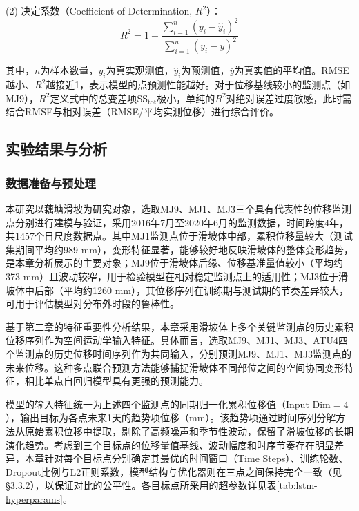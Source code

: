 \documentclass[12pt,a4paper]{article}
\begin{document}
(2) 决定系数（Coefficient of Determination, $R^2$）：
\begin{equation}
R^2 = 1 - \frac{\sum_{i=1}^{n}(y_i - \hat{y}_i)^2}{\sum_{i=1}^{n}(y_i - \bar{y})^2}
\label{eq:r2}
\end{equation}

其中，$n$为样本数量，$y_i$为真实观测值，$\hat{y}_i$为预测值，$\bar{y}$为真实值的平均值。RMSE越小、$R^2$越接近1，表示模型的点预测性能越好。对于位移基线较小的监测点（如MJ9），$R^2$定义式中的总变差项$\mathrm{SS_{tot}}$极小，单纯的$R^2$对绝对误差过度敏感，此时需结合RMSE与相对误差（RMSE/平均实测位移）进行综合评价。


\subsection{实验结果与分析}

\subsubsection{数据准备与预处理}

本研究以藕塘滑坡为研究对象，选取MJ9、MJ1、MJ3三个具有代表性的位移监测点分别进行建模与验证，采用2016年7月至2020年6月的监测数据，时间跨度4年，共1457个日尺度数据点。其中MJ1监测点位于滑坡体中部，累积位移量较大（测试集期间平均约989 mm），变形特征显著，能够较好地反映滑坡体的整体变形趋势，是本章分析展示的主要对象；MJ9位于滑坡体后缘、位移基准量值较小（平均约373 mm）且波动较窄，用于检验模型在相对稳定监测点上的适用性；MJ3位于滑坡体中后部（平均约1260 mm），其位移序列在训练期与测试期的节奏差异较大，可用于评估模型对分布外时段的鲁棒性。

基于第二章的特征重要性分析结果，本章采用滑坡体上多个关键监测点的历史累积位移序列作为空间运动学输入特征。具体而言，选取MJ9、MJ1、MJ3、ATU4四个监测点的历史位移时间序列作为共同输入，分别预测MJ9、MJ1、MJ3监测点的未来位移。这种多点联合预测方法能够捕捉滑坡体不同部位之间的空间协同变形特征，相比单点自回归模型具有更强的预测能力。

模型的输入特征统一为上述四个监测点的同期归一化累积位移值（Input Dim$=4$），输出目标为各点未来1天的趋势项位移（mm）。该趋势项通过时间序列分解方法从原始累积位移中提取，剔除了高频噪声和季节性波动，保留了滑坡位移的长期演化趋势。考虑到三个目标点的位移量值基线、波动幅度和时序节奏存在明显差异，本章针对每个目标点分别确定其最优的时间窗口（Time Steps）、训练轮数、Dropout比例与L2正则系数，模型结构与优化器则在三点之间保持完全一致（见\S3.3.2），以保证对比的公平性。各目标点所采用的超参数详见表\ref{tab:lstm-hyperparams}。
\end{document}
